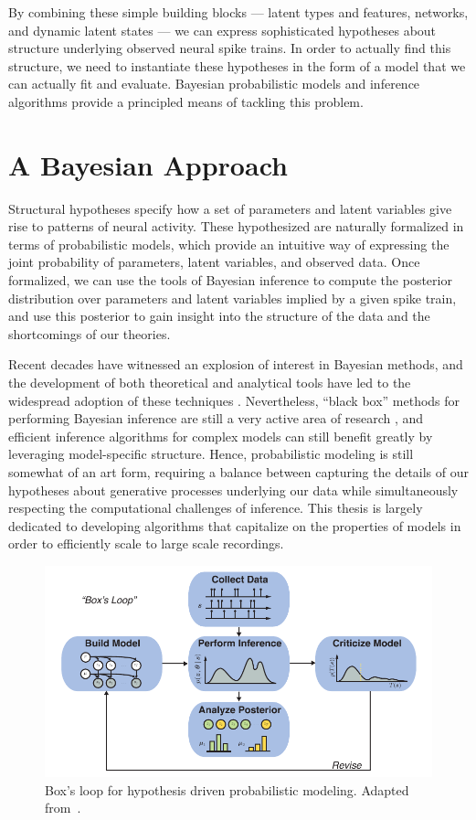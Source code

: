 By combining these simple building blocks --- latent types and features, 
networks, and dynamic latent states --- we can express sophisticated 
hypotheses about structure underlying observed neural spike trains. 
In order to actually find this structure, we need to instantiate these 
hypotheses in the form of a model that we can actually fit and evaluate.
Bayesian probabilistic models and inference algorithms provide a principled 
means of tackling this problem.


\section{A Bayesian Approach} 
Structural hypotheses specify how a set of parameters and latent
variables give rise to patterns of neural activity.  These
hypothesized are naturally formalized in terms of probabilistic
models, which provide an intuitive way of expressing the joint
probability of parameters, latent variables, and observed data.  Once
formalized, we can use the tools of Bayesian inference to compute the
posterior distribution over parameters and latent variables implied by
a given spike train, and use this posterior to gain insight into the
structure of the data and the shortcomings of our theories.

Recent decades have witnessed an explosion of interest in Bayesian
methods, and the development of both theoretical and analytical tools
have led to the widespread adoption of these techniques
\cite{bishop2006pattern, murphy2012probabilistic}. Nevertheless,
``black box'' methods for performing Bayesian inference are still a
very active area of research \cite{ranganath2013black,
  goodman2008church}, and efficient inference algorithms for complex
models can still benefit greatly by leveraging model-specific
structure. Hence, probabilistic modeling is still somewhat of an art
form, requiring a balance between capturing the details of our
hypotheses about generative processes underlying our data while
simultaneously respecting the computational challenges of inference.
This thesis is largely dedicated to developing algorithms that
capitalize on the properties of models in order to efficiently scale
to large scale recordings.


\begin{figure}[t]
  \centering%
\includegraphics[width=5.5in]{figures/ch1/boxloop} 
\caption[Box's Loop]{Box's loop for hypothesis driven probabilistic modeling.
Adapted from~\citet{blei2014build}.}
\label{fig:boxloop}
\end{figure}

